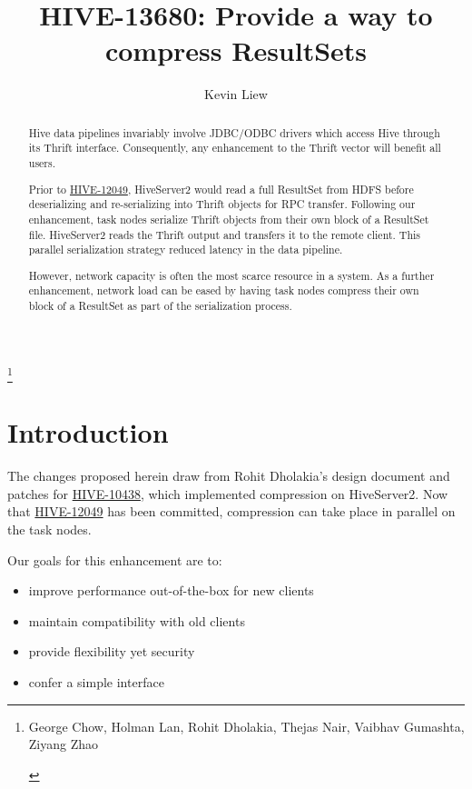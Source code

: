 \documentclass[11pt,a4paper]{article}
\title{HIVE-13680: Provide a way to compress ResultSets}
\author{Kevin Liew}
\begin{document}
\maketitle
\thanks{
	\begin{center}
		George Chow, Holman Lan, Rohit Dholakia, Thejas Nair, Vaibhav Gumashta, Ziyang Zhao
	\end{center}}

\begin{abstract}
	
	Hive data pipelines invariably involve JDBC/ODBC drivers which access Hive through its Thrift interface. 
	Consequently, any enhancement to the Thrift vector will benefit all users.
	
	Prior to 
	\href{https://issues.apache.org/jira/browse/HIVE-12049}{HIVE-12049},
	HiveServer2 would read a full ResultSet from HDFS before deserializing and re-serializing into Thrift objects for RPC transfer.
	Following our enhancement, task nodes serialize Thrift objects from their own block of a ResultSet file. 
	HiveServer2 reads the Thrift output and transfers it to the remote client. 
	This parallel serialization strategy reduced latency in the data pipeline.
	
	However, network capacity is often the most scarce resource in a system. 
	As a further enhancement, network load can be eased by having task nodes compress their own block of a ResultSet as part of the serialization process.
	
\end{abstract}

\section{Introduction}
	
	The changes proposed herein draw from Rohit Dholakia's design document and patches for
	\href{https://issues.apache.org/jira/browse/HIVE-10438}{HIVE-10438}, which implemented compression on HiveServer2.
	Now that
	\href{https://issues.apache.org/jira/browse/HIVE-12049}{HIVE-12049}
	has been committed, compression can take place in parallel on the task nodes.
	
	Our goals for this enhancement are to:
	
	\begin{itemize}
		\item improve performance out-of-the-box for new clients
		\item maintain compatibility with old clients
		\item provide flexibility yet security
		\item confer a simple interface	
	\end{itemize}
	
\end{document}
